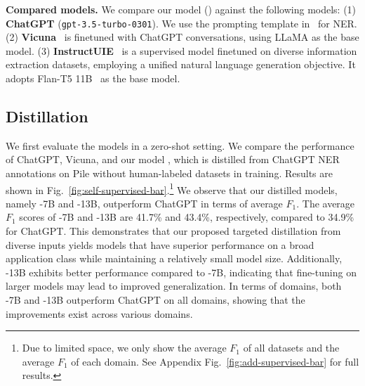 \smallskip
\noindent\textbf{Compared models.}
We compare our model (\shortname{}) against the following models: (1) \textbf{ChatGPT} (\texttt{gpt-3.5-turbo-0301}).
We use the prompting template in~\citet{ye2023comprehensive} for NER.
(2) \textbf{Vicuna}~\citep{vicuna-2023} is finetuned with ChatGPT conversations, using LLaMA as the base model.
(3) \textbf{InstructUIE}~\citep{wang2023instructuie} is a supervised model finetuned on diverse information extraction datasets, employing a unified natural language generation objective.
It adopts Flan-T5 11B~\citep{chung2022scaling} as the base model.

\subsection{Distillation}
\label{ssec:results_distill}
We first evaluate the models in a zero-shot setting.
We compare the performance of ChatGPT, Vicuna, and our model \shortname, which is distilled from ChatGPT NER annotations on Pile without human-labeled datasets in training.
Results are shown in Fig.~\ref{fig:self-supervised-bar}.\footnote{Due to limited space, we only show the average $F_1$ of all datasets and the average $F_1$ of each domain. See Appendix Fig.~\ref{fig:add-supervised-bar} for full results.}
We observe that our distilled models, namely \shortname-7B and \shortname-13B, outperform ChatGPT in terms of average $F_1$.
The average $F_1$ scores of \shortname-7B and \shortname-13B are 41.7\% and 43.4\%, respectively, compared to 34.9\% for ChatGPT.
This demonstrates that our proposed targeted distillation from diverse inputs yields models that have superior performance on a broad application class while maintaining a relatively small model size.
Additionally, \shortname-13B exhibits better performance compared to \shortname-7B, indicating that fine-tuning on larger models may lead to improved generalization.
In terms of domains, both \shortname-7B and \shortname-13B outperform ChatGPT on all domains, showing that the improvements exist across various domains.

